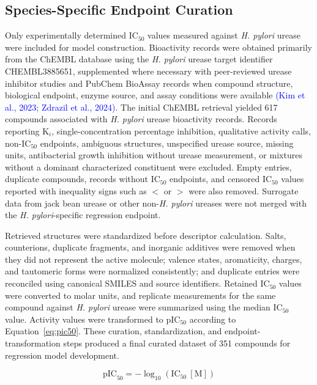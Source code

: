 \documentclass[11pt]{article}
\begin{document}
\subsection{Species-Specific Endpoint Curation}

Only experimentally determined IC$_{50}$ values measured against \textit{H. pylori} urease were included for model construction. Bioactivity records were obtained primarily from the ChEMBL database using the \textit{H. pylori} urease target identifier CHEMBL3885651, supplemented where necessary with peer-reviewed urease inhibitor studies and PubChem BioAssay records when compound structure, biological endpoint, enzyme source, and assay conditions were available \textcolor{blue}{(Kim et al., 2023; Zdrazil et al., 2024)}. The initial ChEMBL retrieval yielded 617 compounds associated with \textit{H. pylori} urease bioactivity records. Records reporting K$_i$, single-concentration percentage inhibition, qualitative activity calls, non-IC$_{50}$ endpoints, ambiguous structures, unspecified urease source, missing units, antibacterial growth inhibition without urease measurement, or mixtures without a dominant characterized constituent were excluded. Empty entries, duplicate compounds, records without IC$_{50}$ endpoints, and censored IC$_{50}$ values reported with inequality signs such as $<$ or $>$ were also removed. Surrogate data from jack bean urease or other non-\textit{H. pylori} ureases were not merged with the \textit{H. pylori}-specific regression endpoint.

Retrieved structures were standardized before descriptor calculation. Salts, counterions, duplicate fragments, and inorganic additives were removed when they did not represent the active molecule; valence states, aromaticity, charges, and tautomeric forms were normalized consistently; and duplicate entries were reconciled using canonical SMILES and source identifiers. Retained IC$_{50}$ values were converted to molar units, and replicate measurements for the same compound against \textit{H. pylori} urease were summarized using the median IC$_{50}$ value. Activity values were transformed to pIC$_{50}$ according to Equation~\ref{eq:pic50}. These curation, standardization, and endpoint-transformation steps produced a final curated dataset of 351 compounds for regression model development.

\begin{equation}
\mathrm{pIC}_{50} = -\log_{10}\left(\mathrm{IC}_{50}~[\mathrm{M}]\right)
\label{eq:pic50}
\end{equation}
\end{document}
